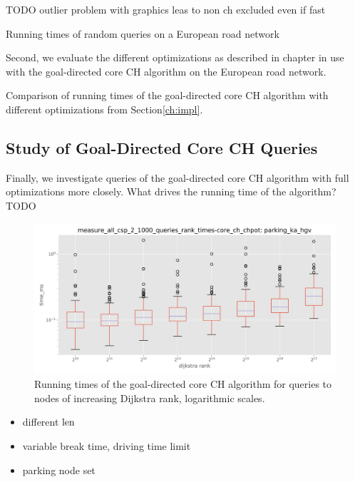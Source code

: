 TODO outlier problem with graphics leas to non ch excluded even if fast
\begin{table}[hbtp]
	\centering
	
	\caption{Running times of random queries on a European road network}
	\label{tbl:extensions_runtime_eur}
\end{table}

Second, we evaluate the different optimizations as described in chapter  in use with the goal-directed core CH algorithm on the European road network.

\begin{table}[hbtp]
	\centering
	
	\caption{Comparison of running times of the goal-directed core CH algorithm with different optimizations from Section\ref{ch:impl}.}
	\label{tbl:opt_runtime}
\end{table}

\subsection{Study of Goal-Directed Core CH Queries}
Finally, we investigate queries of the goal-directed core CH algorithm with full optimizations more closely. What drives the running time of the algorithm? TODO

\begin{figure}[hbtp]
	\centering
	\includegraphics[width=.95\textwidth]{plots/measure_all_csp_2_1000_queries_rank_times-core_ch_chpot-time_ms.png}
	\caption{Running times of the goal-directed core CH algorithm for queries to nodes of increasing Dijkstra rank, logarithmic scales.}
	\label{fig:rank_times}
\end{figure}

\begin{itemize}
	\item different $\operatorname{len}$
	\item variable break time, driving time limit
	\item parking node set
\end{itemize}
